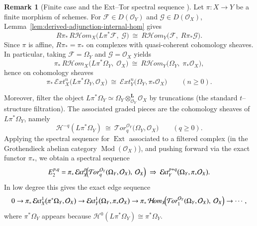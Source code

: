 \documentclass[11pt,twoside]{amsart}
\theoremstyle{plain}
\numberwithin{equation}{section}
\theoremstyle{definition}
\newtheorem{remark}[theorem]{Remark}
\begin{document}
\begin{remark}[Finite case and the Ext--Tor spectral sequence {\cite[Tag 0G1Z]{stacks-project}}]
\label{rem:finite-ext-tor}
Let $\pi:X\to Y$ be a finite morphism of schemes. For $\mathcal F\in D(\mathcal O_Y)$ and
$\mathcal G\in D(\mathcal O_X)$, Lemma~\ref{lem:derived-adjunction-internal-hom} gives
\[
R\pi_*\,R\mathcal H\!om_X\bigl(L\pi^*\mathcal F,\;\mathcal G\bigr)\ \cong\
R\mathcal H\!om_Y\bigl(\mathcal F,\;R\pi_*\mathcal G\bigr).
\]
Since $\pi$ is affine, $R\pi_*=\pi_*$ on complexes with quasi-coherent cohomology sheaves.
In particular, taking $\mathcal F=\Omega_Y$ and $\mathcal G=\mathcal O_X$ yields
\[
\pi_*\,R\mathcal H\!om_X\bigl(L\pi^*\Omega_Y,\;\mathcal O_X\bigr)
\ \cong\
R\mathcal H\!om_Y\bigl(\Omega_Y,\;\pi_*\mathcal O_X\bigr),
\]
hence on cohomology sheaves
\[
\pi_*\,\mathcal E\!xt_X^n\bigl(L\pi^*\Omega_Y,\mathcal O_X\bigr)
\ \cong\
\mathcal E\!xt_Y^n\bigl(\Omega_Y,\pi_*\mathcal O_X\bigr)\qquad(n\ge 0).
\]

Moreover, filter the object $L\pi^*\Omega_Y\simeq \Omega_Y\otimes_{\mathcal O_Y}^{\mathbf L}\mathcal O_X$
by truncations (the standard $t$--structure filtration). The associated graded pieces are the cohomology
sheaves of $L\pi^*\Omega_Y$, namely
\[
\mathcal H^{-q}(L\pi^*\Omega_Y)\ \cong\ \mathcal T\!or_q^{\mathcal O_Y}\bigl(\Omega_Y,\mathcal O_X\bigr)\qquad(q\ge 0).
\]
Applying the spectral sequence for $\operatorname{Ext}$ associated to a filtered complex
\cite[Tag 0G1Z]{stacks-project} (in the Grothendieck abelian category $\operatorname{Mod}(\mathcal O_X)$),
and pushing forward via the exact functor $\pi_*$, we obtain a spectral sequence
\[
E_2^{p,q}
=
\pi_*\,\mathcal E\!xt_X^{p}\!\Bigl(\mathcal T\!or_q^{\mathcal O_Y}(\Omega_Y,\mathcal O_X),\ \mathcal O_X\Bigr)
\ \Rightarrow\
\mathcal E\!xt_Y^{p+q}\bigl(\Omega_Y,\pi_*\mathcal O_X\bigr).
\]
In low degree this gives the exact edge sequence
\[
0\to
\pi_*\,\mathcal E\!xt_X^{1}\bigl(\pi^*\Omega_Y,\mathcal O_X\bigr)
\to
\mathcal E\!xt_Y^{1}\bigl(\Omega_Y,\pi_*\mathcal O_X\bigr)
\to
\pi_*\,\mathcal H\!om_X\!\Bigl(\mathcal T\!or^{\mathcal O_Y}_1(\Omega_Y,\mathcal O_X),\ \mathcal O_X\Bigr)\to\cdots,
\]
where $\pi^*\Omega_Y$ appears because $\mathcal H^0(L\pi^*\Omega_Y)\cong \pi^*\Omega_Y$.
\end{remark}
\end{document}
